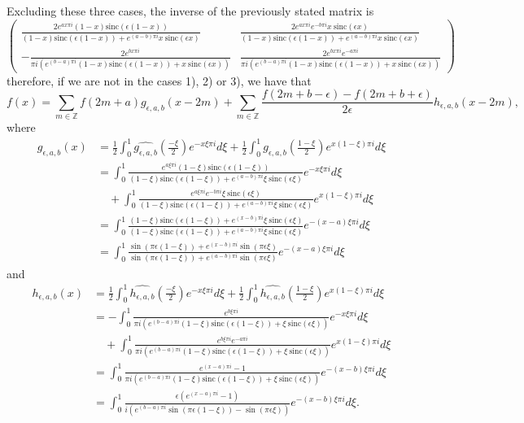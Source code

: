 \documentclass[reqno]{amsart}
\theoremstyle{plain}
\theoremstyle{definition}
\numberwithin{equation}{section}
\newcommand{\Z}{{\mathbb Z}}
\newcommand{\pa}[1]{\left(#1\right)}
\newcommand{\sinc}{\mathrm{sinc}}
\begin{document}
Excluding these three cases, the inverse of the previously stated matrix is
$$
\begin{pmatrix}
    \displaystyle \frac{2 e^{a x \pi i} (1-x) \sinc(\epsilon (1-x))}{(1-x) \sinc(\epsilon (1-x))+ e^{(a-b)\pi i} x \ \sinc(\epsilon x)} 
    & \displaystyle \frac{2 e^{a x \pi i} e^{-b\pi i} x \ \sinc(\epsilon x)}{(1-x) \sinc(\epsilon (1-x))+ e^{(a-b)\pi i} x \ \sinc(\epsilon x)} \\
    \displaystyle -\frac{2 e^{b x \pi i}}{\pi i \pa{e^{(b-a)\pi i}(1-x) \sinc(\epsilon (1-x))+ x \ \sinc(\epsilon x)}} 
    & \displaystyle \frac{2 e^{b x \pi i} e^{-a\pi i}}{\pi i \pa{e^{(b-a)\pi i}(1-x) \sinc(\epsilon (1-x))+ x \ \sinc(\epsilon x)}} 
\end{pmatrix}$$
therefore, if we are not in the cases 1), 2) or 3), we have that
$$f(x)=\sum_{m\in\Z} f(2m+a) g_{\epsilon,a,b}(x-2m)+\sum_{m\in\Z} \frac{f(2m+b-\epsilon)-f(2m+b+\epsilon)}{2\epsilon} h_{\epsilon,a,b}(x-2m),$$
where
\begin{align*}
    g_{\epsilon,a,b}(x) 
    &= \frac{1}{2} \int_0^1 \widehat{g_{\epsilon,a,b}}\pa{\frac{-\xi}{2}} e^{-x \xi \pi i} d\xi + \frac{1}{2} \int_0^1 \widehat{g_{\epsilon,a,b}}\pa{\frac{1-\xi}{2}} e^{x (1-\xi) \pi i} d\xi \\
    &= \int_0^1\frac{e^{a \xi \pi i} (1-\xi) \sinc(\epsilon (1-\xi))}{(1-\xi) \sinc(\epsilon (1-\xi))+ e^{(a-b)\pi i} \xi \ \sinc(\epsilon \xi)} e^{-x \xi \pi i} d\xi \\
    & \quad + \int_0^1\frac{e^{a \xi \pi i} e^{-b\pi i} \xi \ \sinc(\epsilon \xi)}{(1-\xi) \sinc(\epsilon (1-\xi))+ e^{(a-b)\pi i} \xi \ \sinc(\epsilon \xi)} e^{x (1-\xi) \pi i} d\xi \\
    &= \int_0^1\frac{(1-\xi) \sinc(\epsilon (1-\xi))+ e^{(x-b)\pi i} \xi \ \sinc(\epsilon \xi)}{(1-\xi) \sinc(\epsilon (1-\xi))+ e^{(a-b)\pi i} \xi \ \sinc(\epsilon \xi)} e^{-(x-a) \xi \pi i} d\xi \\
    &= \int_0^1 \frac{\sin\pa{\pi \epsilon (1-\xi)} + e^{(x-b)\pi i}\sin\pa{\pi \epsilon \xi}}
    {\sin\pa{\pi \epsilon (1-\xi)} + e^{(a-b)\pi i}\sin\pa{\pi \epsilon \xi}} e^{-(x-a)\xi\pi i} d\xi
\end{align*}
and
\begin{align*}
    h_{\epsilon,a,b}(x)
    &=\frac{1}{2} \int_0^1 \widehat{h_{\epsilon,a,b}}\pa{\frac{-\xi}{2}} e^{-x \xi \pi i} d\xi + \frac{1}{2} \int_0^1 \widehat{h_{\epsilon,a,b}}\pa{\frac{1-\xi}{2}} e^{x (1-\xi) \pi i} d\xi \\
    &= -\int_0^1 \frac{e^{b \xi \pi i}}{\pi i \pa{e^{(b-a)\pi i}(1-\xi) \sinc(\epsilon (1-\xi))+ \xi \ \sinc(\epsilon \xi)}}  e^{-x \xi \pi i} d\xi \\
    & \quad + \int_0^1 \frac{e^{b \xi \pi i} e^{-a\pi i}}{\pi i \pa{e^{(b-a)\pi i} (1-\xi) \sinc(\epsilon (1-\xi))+ \xi \ \sinc(\epsilon \xi)}} e^{x (1-\xi) \pi i} d\xi \\
    &= \int_0^1 \frac{e^{(x-a)\pi i}-1}{\pi i \pa{e^{(b-a)\pi i}(1-\xi) \sinc(\epsilon (1-\xi))+ \xi \ \sinc(\epsilon \xi)}}  e^{-(x-b) \xi \pi i} d\xi \\
    &= \int_0^1 \frac{\epsilon \pa{e^{(x-a)\pi i}-1}}{i\pa{e^{(b-a)\pi i}\sin\pa{\pi \epsilon (1-\xi)}-\sin\pa{\pi \epsilon \xi}}}
    e^{-(x-b)\xi \pi i} d\xi.
\end{align*}
\end{document}
